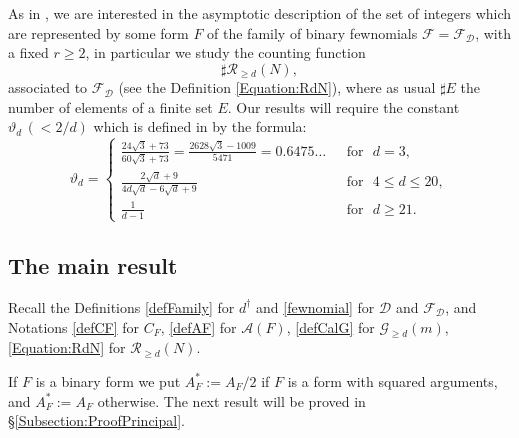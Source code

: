 \documentclass[10pt]{article}
\theoremstyle{definition}
\numberwithin{equation}{section}
\newcommand{\calA}{\mathcal {A}}
\newcommand{\calG}{\mathcal {G}}
\newcommand{\calR}{\mathcal {R}}
\begin{document}
As in \cite{FW1}, \cite{FW2} we are interested in the asymptotic description of the set of integers which are represented by some form $F$ of the family of binary fewnomials $\mathcal F = \mathcal F_{\boldsymbol {\mathcal D}}$, with a fixed $r\geqslant 2$, in particular we study the counting function 
\[
\sharp \calR_{\geqslant d}(N),
\] 
associated to $\mathcal F_{\boldsymbol{ \mathcal D}}$ (see the Definition \eqref{Equation:RdN}), where as usual $\sharp E$ the number of elements of a finite set $E$.
Our results 
will require the constant $\vartheta_d\, (<2/d)$ which is defined in \cite[(2.1)]{FW1} by the formula:
 \begin{equation*} 
 \vartheta_d=
 \begin{cases}
 \displaystyle
 \frac {24\sqrt 3+73}{60\sqrt 3 +73}=\frac {2628\sqrt 3-1009}{5471}=0.6475\dots &\text{ {for} } d=3,\\
\displaystyle
 \frac {2\sqrt d +9}{4 d \sqrt d -6\sqrt d +9} & \text{ {for} } 4\leqslant d\leqslant 20,\\
 \displaystyle
 \frac 1{d-1} & \text{ {for} } d\geqslant 21.
 \end{cases}
 \end{equation*}
 

\subsection{The main result} 

Recall the Definitions \ref{defFamily} for $d^\dag$ and \ref{fewnomial} for ${\boldsymbol{ \mathcal D}} $ and $\mathcal F_{\boldsymbol{ \mathcal D}}$, and Notations
\eqref{defCF} for $C_F$, \eqref{defAF} for $\calA(F)$, 
\eqref{defCalG} for $\calG_{\geqslant d}(m)$,
\eqref{Equation:RdN} for $ \calR_{\geqslant d}(N)$.

 

 If $F$ is a binary form we put $A^*_F :=A_F/2$ if $F$ is a form with squared arguments, 
 and $A^*_F :=A_F$ otherwise. 
The next result will be proved in \S \ref{Subsection:ProofPrincipal}. 
 
\end{document}
